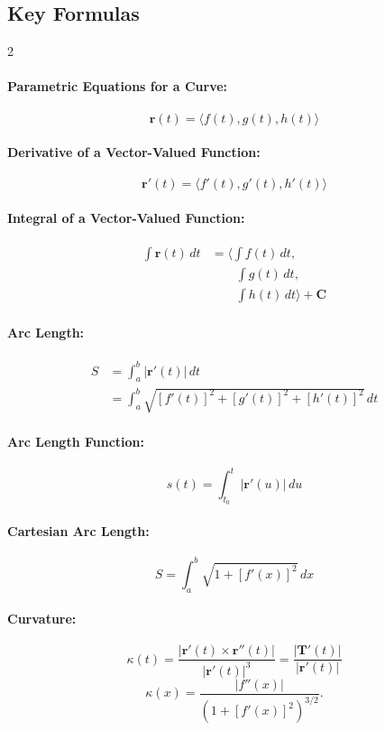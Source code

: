 \subsection*{Key Formulas}
\begin{multicols}{2}

\paragraph{Parametric Equations for a Curve:}
\[
\mathbf{r}(t) = \langle f(t), g(t), h(t) \rangle
\]

\paragraph{Derivative of a Vector-Valued Function:}
\[
\mathbf{r}'(t) = \langle f'(t), g'(t), h'(t) \rangle
\]

\paragraph{Integral of a Vector-Valued Function:}
\begin{align*}
\int \mathbf{r}(t) \, dt &= \langle \int f(t) \, dt, \\
&\qquad \int g(t) \, dt, \\
&\qquad \int h(t) \, dt \rangle + \mathbf{C}
\end{align*}

\paragraph{Arc Length:}
\begin{align*}
S &= \int_a^b |\mathbf{r}'(t)| \, dt \\
  &= \int_a^b \sqrt{[f'(t)]^2 + [g'(t)]^2 + [h'(t)]^2} \, dt
\end{align*}

\paragraph{Arc Length Function:}
\[
s(t) = \int_{t_0}^{t} |\mathbf{r}'(u)| \, du
\]

\paragraph{Cartesian Arc Length:}
\[
S = \int_a^b \sqrt{1 + [f'(x)]^2} \, dx
\]

\paragraph{Curvature:}
\[
\kappa(t) = \frac{|\mathbf{r}'(t) \times \mathbf{r}''(t)|}{|\mathbf{r}'(t)|^3} = \frac{|\mathbf{T}'(t)|}{|\mathbf{r}'(t)|}
\]
\[
\kappa(x) = \frac{|f''(x)|}{\left( 1 + [f'(x)]^2 \right)^{3/2}}.
\]


\end{multicols}
